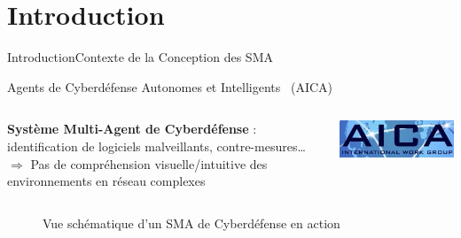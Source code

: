

\addtocounter{framenumber}{-1}

\section{Introduction}
\begin{frame}{Introduction}{Contexte de la Conception des SMA}

    \begin{center}
        \begin{minipage}{0.95\linewidth}
            \centering
            \begin{exampleblock}{Agents de Cyberdéfense Autonomes et Intelligents~\parencite{Kott2023} (AICA)}

                \begin{columns}
                    \hspace{5ex}
                    \begin{column}{0.85\textwidth}
                        \textbf{Système Multi-Agent de Cyberdéfense} : identification de logiciels malveillants, contre-mesures\dots \\
                        $\Longrightarrow$ Pas de compréhension visuelle/intuitive des environnements en réseau complexes
                    \end{column}
                    \begin{column}{0.22\textwidth}
                        \hspace{-2.5ex}
                        \includegraphics[width=0.8\linewidth]{figures/AICA_IWG.jpg}
                    \end{column}
                \end{columns}

            \end{exampleblock}
        \end{minipage}
    \end{center}

    \begin{figure}
        \centering
        
        \caption*{Vue schématique d'un SMA de Cyberdéfense en action}
        \label{fig:my_label}
    \end{figure}

\end{frame}

